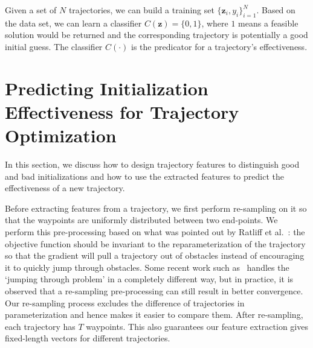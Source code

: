 \documentclass[letterpaper, 10 pt, conference]{ieeeconf}  %
\newcommand{\fsym}{\mbox{$\mathbf z$}}
\begin{document}
Given a set of $N$ trajectories, we can build a training set $\{\fsym_i, y_i\}_{i=1}^N$. Based on the data set, we can learn a classifier $C(\fsym) = \{0, 1\}$, where $1$ means a feasible solution would be returned and the corresponding trajectory is potentially a good initial guess. The classifier $C(\cdot)$ is the predicator for a trajectory's effectiveness. 

\section{Predicting Initialization Effectiveness for Trajectory Optimization}
\label{sec:predict}

In this section, we discuss how to design trajectory features to distinguish good and bad initializations and how to use the extracted features to predict the effectiveness of a new trajectory.

Before extracting features from a trajectory, we first perform re-sampling on it so that the waypoints are uniformly distributed between two end-points. We perform this pre-processing based on what was pointed out by Ratliff et al.~\cite{Ratliff:2009:CGO}: the objective function should be invariant to the reparameterization of the trajectory so that the gradient will pull a trajectory out of obstacles instead of encouraging it to quickly jump through obstacles. Some recent work such as~\cite{Schulman:2013:FLO} handles the `jumping through problem' in a completely different way, but in practice, it is observed that a re-sampling pre-processing can still result in better convergence. Our re-sampling process excludes the difference of trajectories in parameterization and hence makes it easier to compare them. After re-sampling, each trajectory has $T$ waypoints. This also guarantees our feature extraction gives fixed-length vectors for different trajectories.
\end{document}
